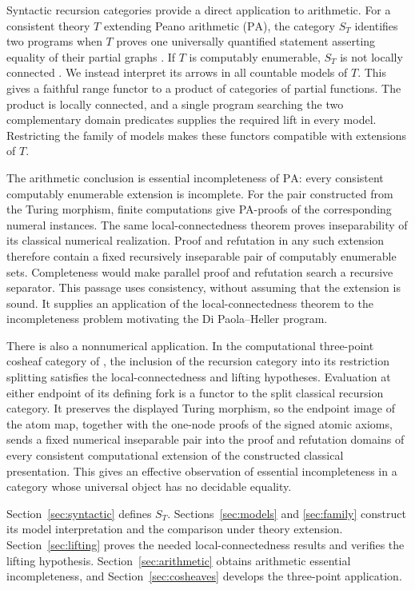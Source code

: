 \documentclass[11pt]{article}
\newcommand{\PA}{\mathrm{PA}}
\begin{document}
Syntactic recursion categories provide a direct application to
arithmetic. For a consistent theory $T$ extending Peano arithmetic
($\PA$), the category $S_T$ identifies two programs when $T$ proves
one universally quantified statement asserting equality of their
partial graphs \cite{Montagna,DPM}. If $T$ is computably enumerable,
$S_T$ is not locally connected \cite[Corollary 4.4]{DPM}.
We instead interpret its arrows in all countable models of $T$.
This gives a faithful range functor to a product of categories of
partial functions. The product is locally connected, and a single
program searching the two complementary domain predicates supplies
the required lift in every model. Restricting the family of models
makes these functors compatible with extensions of $T$.

The arithmetic conclusion is essential incompleteness of $\PA$:
every consistent computably enumerable extension is incomplete.
For the pair constructed from the Turing morphism, finite computations
give PA-proofs of the corresponding numeral instances. The same
local-connectedness theorem proves inseparability of its classical
numerical realization. Proof and
refutation in any such extension therefore contain a fixed recursively
inseparable pair of computably enumerable sets. Completeness would
make parallel proof and refutation search a recursive separator.
This passage uses consistency, without assuming that the extension
is sound. It supplies an application of the local-connectedness
theorem to the incompleteness problem motivating the Di Paola--Heller
program.

There is also a nonnumerical application. In the computational
three-point cosheaf category of \cite{ThreePoint}, the inclusion of
the recursion category into its restriction splitting satisfies the
local-connectedness and lifting hypotheses. Evaluation at either
endpoint of its defining fork is a functor to the split classical
recursion category. It preserves the displayed Turing morphism, so
the endpoint image of the atom map, together with the one-node
proofs of the signed atomic axioms, sends a fixed numerical inseparable
pair into the proof and refutation domains of every consistent
computational extension of the constructed classical presentation. This gives
an effective observation of essential incompleteness in a category
whose universal object has no decidable equality.

Section~\ref{sec:syntactic} defines $S_T$.
Sections~\ref{sec:models} and \ref{sec:family} construct its
model interpretation and the comparison under theory extension.
Section~\ref{sec:lifting} proves the needed local-connectedness
results and verifies the lifting hypothesis.
Section~\ref{sec:arithmetic} obtains arithmetic essential
incompleteness, and Section~\ref{sec:cosheaves} develops the
three-point application.
\end{document}
